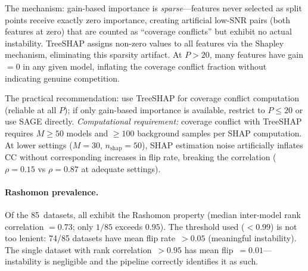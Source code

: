\documentclass[11pt,a4paper]{article}
\begin{document}
The mechanism: gain-based importance is \emph{sparse}---features never
selected as split points receive exactly zero importance, creating
artificial low-SNR pairs (both features at zero) that are counted as
``coverage conflicts'' but exhibit no actual instability.  TreeSHAP
assigns non-zero values to all features via the Shapley mechanism,
eliminating this sparsity artifact.  At $P > 20$, many features have
gain${}=0$ in any given model, inflating the coverage conflict fraction
without indicating genuine competition.

The practical recommendation: use TreeSHAP for coverage conflict
computation (reliable at all $P$); if only gain-based importance is
available, restrict to $P \leq 20$ or use SAGE directly.
\emph{Computational requirement:} coverage conflict with TreeSHAP
requires $M \geq 50$ models and $\geq 100$ background samples per
SHAP computation.  At lower settings ($M = 30$, $n_{\text{shap}} = 50$),
SHAP estimation noise artificially inflates CC without corresponding
increases in flip rate, breaking the correlation ($\rho = 0.15$ vs
$\rho = 0.87$ at adequate settings).

\paragraph{Rashomon prevalence.}
Of the 85~datasets, all exhibit the Rashomon property (median
inter-model rank correlation $= 0.73$; only $1/85$ exceeds $0.95$).
The threshold used ($<0.99$) is not too lenient: 74/85 datasets have
mean flip rate~$> 0.05$ (meaningful instability).  The single dataset
with rank correlation~$> 0.95$ has mean flip~$= 0.01$---instability
is negligible and the pipeline correctly identifies it as such.
\end{document}
